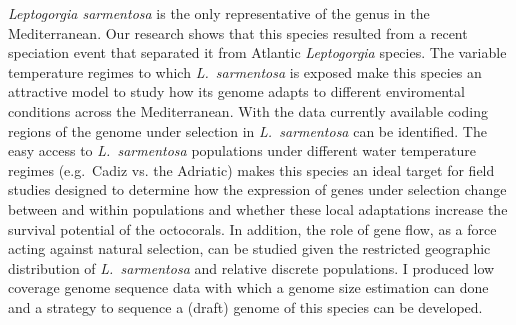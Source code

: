\documentclass[a4paper,11pt]{article}
\begin{document}
\emph{Leptogorgia sarmentosa} is the only representative of the genus in the Mediterranean. Our research shows that this species resulted from a recent speciation event that separated it from Atlantic \emph{Leptogorgia} species. The variable temperature regimes to which \emph{L.~sarmentosa} is exposed make this species an attractive model to study how its genome adapts to different enviromental conditions across the Mediterranean. With the data currently available coding regions of the genome under selection in \emph{L.~sarmentosa} can be identified. The easy access to \emph{L.~sarmentosa} populations under different water temperature regimes (e.g.~Cadiz vs. the Adriatic) makes this species an ideal target for field studies designed to determine how the expression of genes under selection change between and within populations and whether these local adaptations increase the survival potential of the octocorals. In addition, the role of gene flow, as a force acting against natural selection, can be studied given the restricted geographic distribution of \emph{L.~sarmentosa} and relative discrete populations. I produced low coverage genome sequence data with which a genome size estimation can done and a strategy to sequence a (draft) genome of this species can be developed.\\

















\newpage

\end{document}
